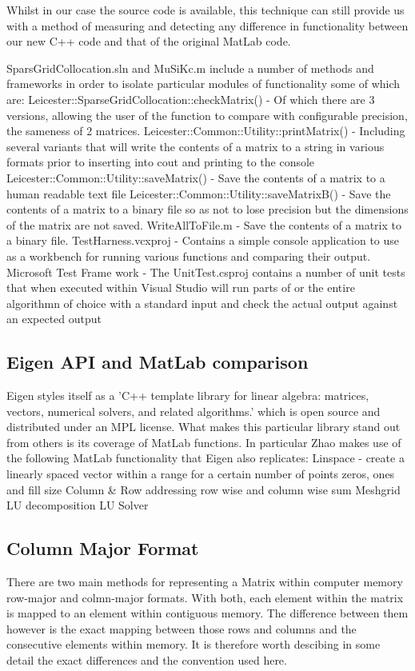 \documentclass[a4paper]{amsart}
\begin{document}
Whilst in our case the source code is available, this technique can still provide us with a method of measuring and detecting any difference in functionality between our new C++ code and that of the original MatLab code.

SparsGridCollocation.sln and MuSiKc.m include a number of methods and frameworks in order to isolate particular modules of functionality some of which are:
Leicester::SparseGridCollocation::checkMatrix() - Of which there are 3 versions, allowing the user of the function to compare with configurable precision, the sameness of 2 matrices.
Leicester::Common::Utility::printMatrix() - Including several variants that will write the contents of a matrix to a string in various formats prior to inserting into cout and printing to the console
Leicester::Common::Utility::saveMatrix() - Save the contents of a matrix to a human readable text file
Leicester::Common::Utility::saveMatrixB() - Save the contents of a matrix to a binary file so as not to lose precision but the dimensions of the matrix are not saved.
WriteAllToFile.m - Save the contents of a matrix to a binary file.
TestHarness.vcxproj - Contains a simple console application to use as a workbench for running various functions and comparing their output.
Microsoft Test Frame work -  The UnitTest.csproj contains a number of unit tests that when executed within Visual Studio will run parts of or the entire algorithmn of choice with a standard input and check the actual output against an expected output


\subsection{Eigen API and MatLab comparison}
Eigen styles itself as a 'C++ template library for linear algebra: matrices, vectors, numerical solvers, and related algorithms.' which is open source and distributed under an MPL license. What makes this particular library stand out from others is its coverage of MatLab functions. In particular Zhao makes use of the following MatLab functionality that Eigen also replicates:
Linspace - create a linearly spaced vector within a range for a certain number of points
zeros, ones and fill
size
Column \& Row addressing
row wise and column wise sum
Meshgrid
LU decomposition
LU Solver

\subsection{Column Major Format}
There are two main methods for representing a Matrix within computer memory row-major and colmn-major formats. With both, each element within the matrix is mapped to an element within contiguous memory. The difference between them however is the exact mapping between those rows and columns and the consecutive elements within memory. It is therefore worth descibing in some detail the exact differences and the convention used here.
\end{document}
